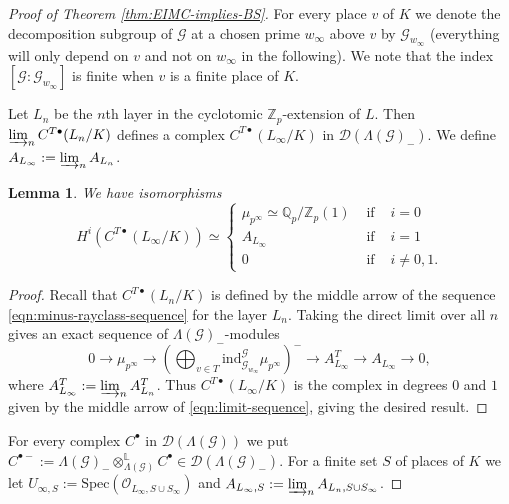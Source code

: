 \documentclass[12pt]{amsart}
\theoremstyle{plain}
\newtheorem{lemma}[theorem]{Lemma}
\theoremstyle{remark}
\theoremstyle{definition}
\numberwithin{equation}{section}
\begin{document}
{\begin{proof}[Proof of Theorem \ref{thm:EIMC-implies-BS}]
For every place $v$ of $K$ we denote the decomposition subgroup of $\mathcal{G}$ at a chosen prime $w_{\infty}$
above $v$ by $\mathcal{G}_{w_{\infty}}$ (everything will only depend on $v$ and not on $w_{\infty}$ in the following).
We note that the index $[\mathcal{G}:\mathcal{G}_{w_{\infty}}]$ is finite when $v$ is a finite place of $K$.

Let $L_{n}$ be the $n$th layer in the cyclotomic ${\mathbb{Z}}_{p}$-extension of $L$.
Then $\varinjlim_{n} C^{T \bullet}(L_{n}/K)$ defines a complex $C^{T \bullet}(L_{\infty}/K)$ in $\mathcal{D}(\Lambda(\mathcal{G})_{-})$.
We define $A_{L_{\infty}} := \varinjlim_{n} A_{L_{n}}$.

\begin{lemma}\label{lem:cohomology_of_C^T}
We have isomorphisms
\[
H^{i}(C^{T \bullet}(L_{\infty}/K)) \simeq \left\{ \begin{array}{lll}
\mu_{p^{\infty}} \simeq {\mathbb{Q}}_{p} / {\mathbb{Z}}_{p} (1) & \mbox{ if } & i=0 \\
A_{L_{\infty}} & \mbox{ if } & i=1 \\
0 & \mbox{ if } & i\not= 0,1.
\end{array} \right.
\]
\end{lemma}

\begin{proof}
Recall that $C^{T \bullet}(L_{n}/K)$ is defined by the middle arrow of the sequence \eqref{eqn:minus-rayclass-sequence} for the layer $L_{n}$.
Taking the direct limit over all $n$ gives an exact sequence of $\Lambda(\mathcal{G})_{-}$-modules
\begin{equation}\label{eqn:limit-sequence}
0 \longrightarrow \mu_{p^{\infty}} \longrightarrow \left( \bigoplus_{v \in T} {\mathrm{ind}}_{\mathcal{G}_{w_{\infty}}}^{\mathcal{G}} \mu_{p^{\infty}} \right)^{-}
 \longrightarrow A_{L_{\infty}}^{T} \longrightarrow A_{L_{\infty}} \longrightarrow 0, 
\end{equation}
where $A_{L_{\infty}}^{T} := \varinjlim_{n} A_{L_{n}}^{T}$.
Thus $C^{T \bullet}(L_{\infty}/K)$ is the complex in degrees $0$ and $1$ given by the middle arrow of \eqref{eqn:limit-sequence}, 
giving the desired result. 
\end{proof}

For every complex $C^{\bullet}$ in $\mathcal{D}(\Lambda(\mathcal{G}))$
we put $C^{\bullet -} := \Lambda(\mathcal{G})_{-} \otimes^{\mathbb{L}}_{\Lambda(\mathcal{G})} C^{\bullet} \in \mathcal{D}(\Lambda(\mathcal{G})_{-})$.
For a finite set $S$ of places of $K$ we let $U_{\infty, S} := {\mathrm{Spec}}(\mathcal{O}_{L_{\infty}, S \cup S_{\infty}})$
and $A_{L_{\infty}, S} := \varinjlim_{n} A_{L_{n}, S \cup S_{\infty}}$.


\end{proof}}
\end{document}
